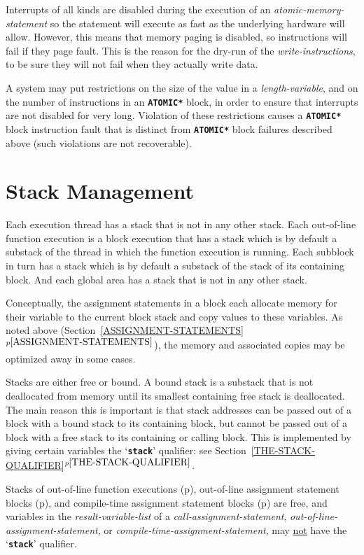 \documentclass[12pt]{article}
\newcommand{\TT}[1]{{\tt \bfseries #1}}
\newcommand{\itemref}[1]{\ref{#1}$^{p\pageref{#1}}$}
\newcommand{\pagref}[1]{p\pageref{#1}}
\begin{document}
Interrupts of all kinds are disabled during the execution of an
{\em atomic-memory-statement} so the statement will execute as
fast as the underlying hardware will allow.  However, this means
that memory paging is disabled, so instructions will fail if
they page fault.  This is the reason for the dry-run of the
{\em write-instructions}, to be sure they will not fail
when they actually write data.

A system may put restrictions on the size of the value in
a {\em length-variable}, and on the number of instructions
in an \TT{*ATOMIC*} block, in order to ensure that interrupts
are not disabled for very long.  Violation of these restrictions
causes a \TT{*ATOMIC*} block instruction fault that is distinct
from \TT{*ATOMIC*} block failures described above (such violations
are not recoverable).

\section{Stack Management}
\label{STACK-MANAGEMENT}

Each execution thread has a stack that is not in any other
stack.  Each out-of-line function
execution is a block execution that has a stack which is
by default a substack of the thread in which the function
execution is running.  Each subblock in turn has a stack
which is by default a substack of the stack of its containing block.
And each global area has a stack that is not in any other stack.

Conceptually, the assignment statements in a block each allocate memory for
their variable to the current block stack and copy values to these
variables.  As noted above (Section~\itemref{ASSIGNMENT-STATEMENTS}),
the memory and associated copies may be
optimized away in some cases.

Stacks are either free or bound.\label{FREE-STACK}
A bound stack is a substack that is
not deallocated from memory until its smallest containing free stack is
deallocated.  The main reason this is important is that stack addresses
can be passed out of a block with a bound stack to its containing block,
but cannot be passed out of a block with a free stack to its containing
or calling block.  This is implemented by giving certain
variables the `\TT{stack}' qualifier: see
Section~\itemref{THE-STACK-QUALIFIER}.

Stacks of out-of-line function executions
(\pagref{OUT-OF-LINE-FUNCTIONS}),
out-of-line assignment statement blocks
(\pagref{OUT-OF-LINE-ASSIGNMENT-STATEMENTS}),
and
compile-time assignment statement blocks
(\pagref{COMPILE-TIME-ASSIGNMENT-STATEMENTS})
are free, and variables in the {\em result-variable-list}
of a {\em call-assignment-statement},
{\em out-of-line-assignment-statement}, or
{\em compile-time-assignment-statement},
may \underline{not} have the `\TT{stack}' qualifier.
\end{document}
